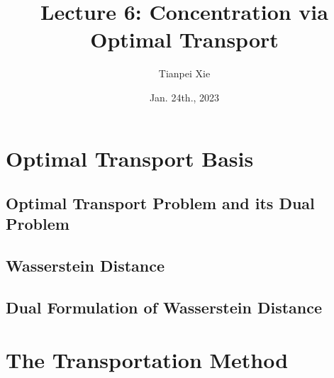 \documentclass[11pt]{article}
\begin{document}
\title{Lecture 6: Concentration via Optimal Transport}
\author{ Tianpei Xie}
\date{Jan. 24th., 2023 }
\maketitle
\tableofcontents
\newpage
\section{Optimal Transport Basis}
\subsection{Optimal Transport Problem and its Dual Problem}
\subsection{Wasserstein Distance}
\subsection{Dual Formulation of Wasserstein Distance}

\section{The Transportation Method}
\end{document}
